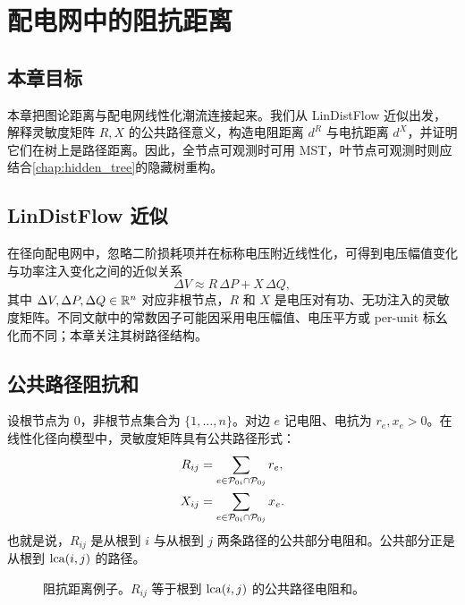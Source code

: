 \chapter{配电网中的阻抗距离}
\label{chap:impedance_distance}

\section*{本章目标}
本章把图论距离与配电网线性化潮流连接起来。我们从 LinDistFlow 近似出发，解释灵敏度矩阵 $R,X$ 的公共路径意义，构造电阻距离 $d^R$ 与电抗距离 $d^X$，并证明它们在树上是路径距离。因此，全节点可观测时可用 MST，叶节点可观测时则应结合\cref{chap:hidden_tree}的隐藏树重构。

\section{LinDistFlow 近似}

在径向配电网中，忽略二阶损耗项并在标称电压附近线性化，可得到电压幅值变化与功率注入变化之间的近似关系
\begin{equation}
  \Delta V \approx R\,\Delta P + X\,\Delta Q,
  \label{eq:lindistflow_matrix}
\end{equation}
其中 $\Delta V,\Delta P,\Delta Q\in\mathbb{R}^n$ 对应非根节点，$R$ 和 $X$ 是电压对有功、无功注入的灵敏度矩阵。不同文献中的常数因子可能因采用电压幅值、电压平方或 per-unit 标幺化而不同；本章关注其树路径结构。

\section{公共路径阻抗和}

设根节点为 $0$，非根节点集合为 $\{1,\ldots,n\}$。对边 $e$ 记电阻、电抗为 $r_e,x_e>0$。在线性化径向模型中，灵敏度矩阵具有公共路径形式：
\begin{align}
  R_{ij} &= \sum_{e\in \mathcal{P}_{0i}\cap \mathcal{P}_{0j}} r_e, \label{eq:R_common_path}\\
  X_{ij} &= \sum_{e\in \mathcal{P}_{0i}\cap \mathcal{P}_{0j}} x_e. \label{eq:X_common_path}
\end{align}
也就是说，$R_{ij}$ 是从根到 $i$ 与从根到 $j$ 两条路径的公共部分电阻和。公共部分正是从根到 $\operatorname{lca}(i,j)$ 的路径。

\begin{figure}[htbp]
  \centering
  
  \caption{阻抗距离例子。$R_{ij}$ 等于根到 $\operatorname{lca}(i,j)$ 的公共路径电阻和。}
  \label{fig:impedance_tree}
\end{figure}

